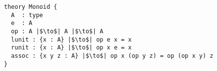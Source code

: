         \begin{verbatim}
theory Monoid { 
  A  : type 
  e  : A
  op : A |$\to$| A |$\to$| A
  lunit : {x : A} |$\to$| op e x = x 
  runit : {x : A} |$\to$| op x e = x 
  assoc : {x y z : A} |$\to$| op x (op y z) = op (op x y) z
}
         \end{verbatim} 
